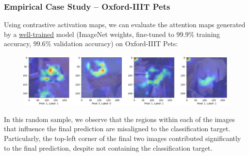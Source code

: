 \documentclass{article}
\theoremstyle{plain}
\theoremstyle{definition}
\theoremstyle{remark}
\begin{document}
\subsubsection{Empirical Case Study -- Oxford-IIIT Pets}
Using contrastive activation maps, we can evaluate the attention maps generated by a \underline{well-trained} model (ImageNet weights, fine-tuned to $99.9\%$ training accuracy, $99.6\%$ validation accuracy) on Oxford-IIIT Pets:

\begin{figure}[h!]
	\centering
	\includegraphics[width=\textwidth]{img/default_cams.png}
\end{figure}

In this random sample, we observe that the regions within each of the images that influence the final prediction are misaligned to the classification target. Particularly, the top-left corner of the final two images contributed significantly to the final prediction, despite not containing the classification target.
\end{document}
